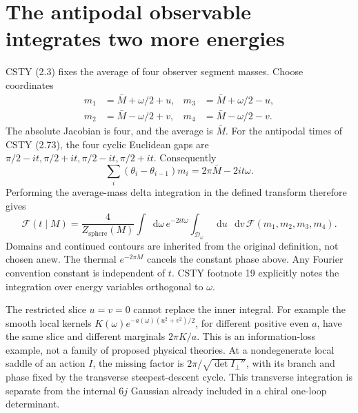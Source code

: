 \documentclass[11pt,a4paper]{article}
\newcommand{\dd}{\mathop{}\!\mathrm d}
\begin{document}
\section{The antipodal observable integrates two more energies}
CSTY (2.3) fixes the average of four observer segment masses.
Choose coordinates
\begin{equation}
 \begin{aligned}
 m_1&=\bar M+\omega/2+u,&m_3&=\bar M+\omega/2-u,\\
 m_2&=\bar M-\omega/2+v,&m_4&=\bar M-\omega/2-v.
 \end{aligned} \label{eq:coords}
\end{equation}
The absolute Jacobian is four, and the average is \(\bar M\).
For the antipodal times of CSTY (2.73), the four cyclic Euclidean
gaps are \(\pi/2-it,\pi/2+it,\pi/2-it,\pi/2+it\). Consequently
\begin{equation}
 \sum_i(\theta_i-\theta_{i-1})m_i=2\pi\bar M-2it\omega.
\end{equation}
Performing the average-mass delta integration in the defined transform
therefore gives
\begin{equation}
 \mathcal F(t\mid M)=\frac4{Z_{\mathrm{sphere}}(M)}
 \int\dd\omega\,e^{-2it\omega}
 \int_{\mathcal D_\omega}\dd u\,\dd v\,
 \boldsymbol{\mathcal F}(m_1,m_2,m_3,m_4).
 \label{eq:push}
\end{equation}
Domains and continued contours are inherited from the original
definition, not chosen anew. The thermal \(e^{-2\pi M}\) cancels
the constant phase above. Any Fourier convention constant is
independent of \(t\). CSTY footnote 19 explicitly notes the integration
over energy variables orthogonal to \(\omega\).

The restricted slice \(u=v=0\) cannot replace the inner integral.
For example the smooth local kernels
\(K(\omega)e^{-a(\omega)(u^2+v^2)/2}\), for different positive even
\(a\), have the same slice and different marginals \(2\pi K/a\).
This is an information-loss example, not a family of proposed physical
theories. At a nondegenerate local saddle of an action \(I\), the
missing factor is \(2\pi/\sqrt{\det I_{\perp}''}\), with its branch
and phase fixed by the transverse steepest-descent cycle.
This transverse integration is separate from the internal \(6j\)
Gaussian already included in a chiral one-loop determinant.
\end{document}

